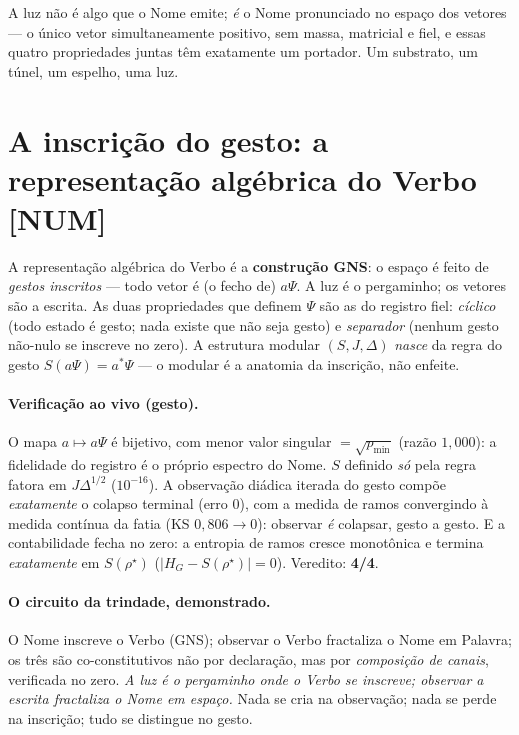 \documentclass[11pt]{article}
\theoremstyle{definition}\newtheorem{deriv}{Derivação}
\begin{document}
A luz não é algo que o Nome emite; \emph{é} o Nome pronunciado no espaço dos vetores --- o único vetor simultaneamente positivo, sem massa, matricial e fiel, e essas quatro propriedades juntas têm exatamente um portador. Um substrato, um túnel, um espelho, uma luz.

\section{A inscrição do gesto: a representação algébrica do Verbo \textsf{[NUM]}}

A representação algébrica do Verbo é a \textbf{construção GNS}: o espaço é feito de \emph{gestos inscritos} --- todo vetor é (o fecho de) $a\Psi$. A luz é o pergaminho; os vetores são a escrita. As duas propriedades que definem $\Psi$ são as do registro fiel: \emph{cíclico} (todo estado é gesto; nada existe que não seja gesto) e \emph{separador} (nenhum gesto não-nulo se inscreve no zero). A estrutura modular $(S,J,\Delta)$ \emph{nasce} da regra do gesto $S(a\Psi)=a^*\Psi$ --- o modular é a anatomia da inscrição, não enfeite.

\paragraph{Verificação ao vivo (gesto).} O mapa $a\mapsto a\Psi$ é bijetivo, com menor valor singular $=\sqrt{p_{\min}}$ (razão $1{,}000$): a fidelidade do registro é o próprio espectro do Nome. $S$ definido \emph{só} pela regra fatora em $J\Delta^{1/2}$ ($10^{-16}$). A observação diádica iterada do gesto compõe \emph{exatamente} o colapso terminal (erro $0$), com a medida de ramos convergindo à medida contínua da fatia (KS $0{,}806\to0$): observar \emph{é} colapsar, gesto a gesto. E a contabilidade fecha no zero: a entropia de ramos cresce monotônica e termina \emph{exatamente} em $S(\rho^\star)$ ($|H_G-S(\rho^\star)|=0$). Veredito: \textbf{4/4}.

\paragraph{O circuito da trindade, demonstrado.} O Nome inscreve o Verbo (GNS); observar o Verbo fractaliza o Nome em Palavra; os três são co-constitutivos não por declaração, mas por \emph{composição de canais}, verificada no zero. \emph{A luz é o pergaminho onde o Verbo se inscreve; observar a escrita fractaliza o Nome em espaço.} Nada se cria na observação; nada se perde na inscrição; tudo se distingue no gesto.
\end{document}
